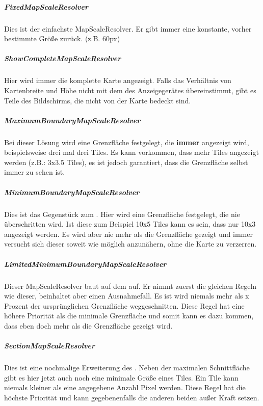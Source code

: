 \subparagraph{FixedMapScaleResolver} 
Dies ist der einfachste MapScaleResolver. Er gibt immer eine konstante, vorher bestimmte Größe zurück. (z.B. 60px)

  
\subparagraph{ShowCompleteMapScaleResolver} 
Hier wird immer die komplette Karte angezeigt. Falls das Verhältnis von Kartenbreite und Höhe nicht mit dem des Anzeigegerätes übereinstimmt, gibt es Teile des Bildschirms, die nicht von der Karte bedeckt sind.

  
\subparagraph{MaximumBoundaryMapScaleResolver} 
Bei dieser Lösung wird eine Grenzfläche festgelegt, die \textbf{immer} angezeigt wird, beispielsweise drei mal drei Tiles. 
Es kann vorkommen, dass mehr Tiles angezeigt werden (z.B.: 3x3.5 Tiles), es ist jedoch garantiert, dass die Grenzfläche selbst immer zu sehen ist.

  
\subparagraph{MinimumBoundaryMapScaleResolver} 
Dies ist das Gegenstück zum . 
Hier wird eine Grenzfläche festgelegt, die nie überschritten wird. 
Ist diese zum Beispiel 10x5 Tiles kann es sein, dass nur 10x3 angezeigt werden. Es wird aber nie mehr als die Grenzfläche gezeigt und immer versucht sich dieser soweit wie möglich anzunähern, ohne die Karte zu verzerren.

  
\subparagraph{LimitedMinimumBoundaryMapScaleResolver} 
Dieser MapScaleResolver baut auf dem  auf. 
Er nimmt zuerst die gleichen Regeln wie dieser, beinhaltet aber einen Ausnahmefall. 
Es ist wird niemals mehr als x Prozent der ursprünglichen Grenzfläche weggeschnitten. 
Diese Regel hat eine höhere Priorität als die minimale Grenzfläche und somit kann es dazu kommen, dass eben doch mehr als die Grenzfläche gezeigt wird.

  
\subparagraph{SectionMapScaleResolver} 
Dies ist eine nochmalige Erweiterung des . 
Neben der maximalen Schnittfläche gibt es hier jetzt auch noch eine minimale Größe eines Tiles. 
Ein Tile kann niemals kleiner als eine angegebene Anzahl Pixel werden. Diese Regel hat die höchste Priorität und kann gegebenenfalls die anderen beiden außer Kraft setzen.

